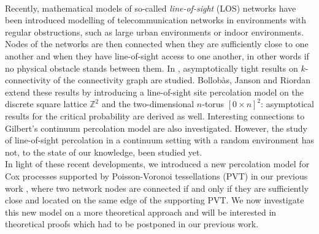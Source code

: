 \documentclass[10pt,a4paper]{amsart}
\theoremstyle{exampstyle}
\theoremstyle{exampnotations}
\begin{document}
\\ \indent Recently, mathematical models of so-called \emph{line-of-sight} (LOS) networks have been introduced modelling of telecommunication networks in environments with regular obstructions, such as large urban environments or indoor environments. Nodes of the networks are then connected when they are sufficiently close to one another and when they have line-of-sight access to one another, in other words if no physical obstacle stands between them. In \cite{frieze2009line}, asymptotically tight results on $k$-connectivity of the connectivity graph are studied. Bollobàs, Janson and Riordan \cite{bollobas2009line} extend these results by introducing a line-of-sight site percolation model on the discrete square lattice $\mathbb{Z}^{2}$ and the two-dimensional $n$-torus $\left[0 \times n \right]^2$: asymptotical results for the critical probability are derived as well. Interesting connections to Gilbert's continuum percolation model are also investigated. However, the study of line-of-sight percolation in a continuum setting with a random environment has not, to the state of our knowledge, been studied yet. \\ \indent In light of these recent developments, we introduced a new percolation model for Cox processes supported by Poisson-Voronoi tessellations (PVT) in our previous work \cite{LeGal1904:Influence}, where two network nodes are connected if and only if they are sufficiently close and located on the same edge of the supporting PVT. We now investigate this new model on a more theoretical approach and will be interested in theoretical proofs which had to be postponed in our previous work.
\end{document}
